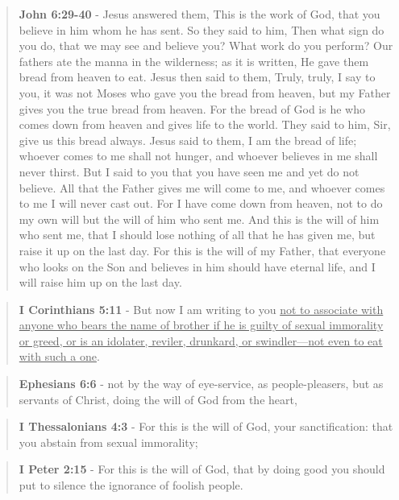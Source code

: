 \documentclass[11pt]{article}
\begin{document}
\begin{quote}
\textbf{John 6:29-40} - Jesus answered them, This is the work of God, that you believe in him whom he has sent. So they said to him, Then what sign do you do, that we may see and believe you? What work do you perform? Our fathers ate the manna in the wilderness; as it is written, He gave them bread from heaven to eat. Jesus then said to them, Truly, truly, I say to you, it was not Moses who gave you the bread from heaven, but my Father gives you the true bread from heaven. For the bread of God is he who comes down from heaven and gives life to the world. They said to him, Sir, give us this bread always. Jesus said to them, I am the bread of life; whoever comes to me shall not hunger, and whoever believes in me shall never thirst. But I said to you that you have seen me and yet do not believe. All that the Father gives me will come to me, and whoever comes to me I will never cast out. For I have come down from heaven, not to do my own will but the will of him who sent me. And this is the will of him who sent me, that I should lose nothing of all that he has given me, but raise it up on the last day. For this is the will of my Father, that everyone who looks on the Son and believes in him should have eternal life, and I will raise him up on the last day.
\end{quote}

\begin{quote}
\textbf{I Corinthians 5:11} - But now I am writing to you \uline{not to associate with anyone who bears the name of brother if he is guilty of sexual immorality or greed, or is an idolater, reviler, drunkard, or swindler—not even to eat with such a one}.
\end{quote}

\begin{quote}
\textbf{Ephesians 6:6} - not by the way of eye-service, as people-pleasers, but as servants of Christ, doing the will of God from the heart,
\end{quote}

\begin{quote}
\textbf{I Thessalonians 4:3} - For this is the will of God, your sanctification: that you abstain from sexual immorality;
\end{quote}

\begin{quote}
\textbf{I Peter 2:15} - For this is the will of God, that by doing good you should put to silence the ignorance of foolish people.
\end{quote}
\end{document}
